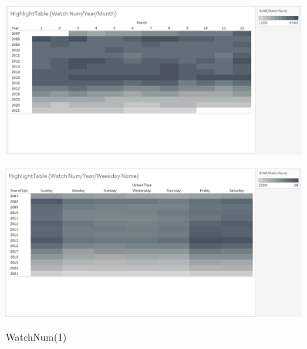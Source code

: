 \documentclass[submit,techrep,noauthor]{ipsj}
\begin{document}
\begin{figure}[h]
\begin{minipage}[b]{0.49\columnwidth}
    \label{fig:highlighttable_watchnum_year_day}
  \end{minipage}
  \begin{minipage}[b]{0.49\columnwidth}
    \centering
    \includegraphics[width=\columnwidth]{./eps/HighlightTable_WatchNum_YearMonth.eps}
    \label{fig:highlighttable_watchnum_year_month}
  \end{minipage}
  \begin{minipage}[b]{0.49\columnwidth}
    \centering
    \includegraphics[width=\columnwidth]{./eps/HighlightTable_WatchNum_YearWeekdayName.eps}
    \label{fig:highlighttable_watchnum_year_weekday}
  \end{minipage}
\vspace{-1.0zh}
  \caption{WatchNum(1)}
  \label{fig:highlighttable_watchnum_year}
\end{figure}
%
\vspace{-2.5zh}
%
\end{document}
